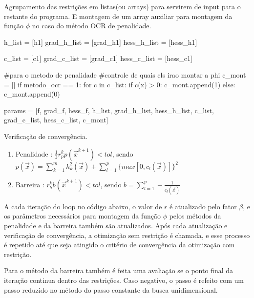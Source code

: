 \documentclass[10pt, a4paper]{article}
\begin{document}
\vspace{5mm}
Agrupamento das restrições em listas(ou arrays) para servirem de input para o restante do programa. 
E montagem de um array auxiliar para montagem da função $\phi$ no caso do método OCR de penalidade.

\begin{python}
  h_list = [h1]
  grad_h_list = [grad_h1]
  hess_h_list = [hess_h1]

  c_list = [c1]
  grad_c_list = [grad_c1]
  hess_c_list = [hess_c1]

  #para o metodo de penalidade
  #controle de quais cls irao montar a phi
  c_mont = []
  if metodo_ocr == 1:
      for c in c_list:
          if c(x) > 0:
              c_mont.append(1)
          else:
              c_mont.append(0)
              
  params = [f, grad_f, hess_f, h_list, grad_h_list, hess_h_list, c_list, grad_c_list, hess_c_list, c_mont]
\end{python}

\vspace{5mm}
Verificação de convergência.

\begin{enumerate}
  \item Penalidade : $\frac{1}{2}r_p^kp(\overrightarrow{x}^{k+1}) < tol$, sendo $p(\overrightarrow{x}) = \sum_{k=1}^{m} h_k^2(\overrightarrow{x}) + \sum_{l=1}^{p}\{max[0,c_l(\overrightarrow{x})]\}^2$
  \item Barreira   : $r_b^kb(\overrightarrow{x}^{k+1}) < tol$, sendo $b = \sum_{l=1}^{p} -\frac{1}{c_l(\overrightarrow{x})}$
\end{enumerate}

A cada iteração do loop no código abaixo, o valor de $r$ é atualizado pelo fator $\beta$, e os parâmetros necessários para montagem
da função $\phi$ pelos métodos da penalidade e da barreira também são atualizados. Após cada atualização e verificação de convergência, 
a otimização sem restrição é chamada, e esse processo é repetido até que seja atingido o critério de convergência da otimização com
restrição.

Para o método da barreira também é feita uma avaliação
se o ponto final da iteração continua dentro das restrições. Caso negativo, o passo é refeito com um passo reduzido no método do passo
constante da busca unidimensional.
\end{document}
